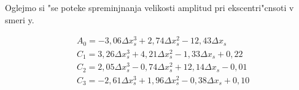 %
%
%
%

Oglejmo si "se poteke spreminjnanja velikosti amplitud pri ekscentri"cnsoti v smeri y.


\begin{eqnarray}
&A_0=-3,06 \Delta x_s^3+2,74 \Delta x_s^2-12,43 \Delta x_s\\
&C_1=3,26\Delta x_s^3+4,21 \Delta x_s^2- 1,33\Delta x_s+0,22\\
&C_2=2,05\Delta x_s^3-0,74\Delta x_s^2+12,14\Delta x_s-0,01\\
&C_3=-2,61\Delta x_s^3+1,96\Delta x_s^2-0,38\Delta x_s +0,10
\end{eqnarray}


